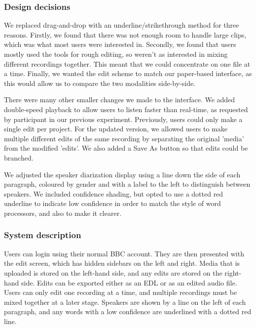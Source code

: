 \subsubsection{Design decisions}

We replaced drag-and-drop with an underline/strikethrough method for three reasons.
Firstly, we found that there was not enough room to handle large clips, which was what most users were interested in.
Secondly, we found that users mostly used the tools for rough editing, so weren't as interested in mixing different
recordings together. This meant that we could concentrate on one file at a time.
Finally, we wanted the edit scheme to match our paper-based interface, as this would allow us to compare the two
modalities side-by-side.

There were many other smaller changes we made to the interface. We added double-speed playback to allow users to listen
faster than real-time, as requested by participant in our previous experiment. Previously, users could only make a
single edit per project. For the updated version, we allowed users to make multiple different edits of the same
recording by separating the original 'media' from the modified 'edits'. We also added a Save As button so that edits
could be branched.

We adjusted the speaker diarization display using a line down the side of each paragraph, coloured by gender and with a
label to the left to distinguish between speakers. We included confidence shading, but opted to use a dotted red
underline to indicate low confidence in order to match the style of word processors, and also to make it clearer.

\subsubsection{System description}

Users can login using their normal BBC account. They are then presented with the edit screen, which
has hidden sidebars on the left and right. Media that is uploaded is stored on the left-hand side, and any edits are
stored on the right-hand side. Edits can be exported either as an EDL or as an edited audio file. Users can only edit
one recording at a time, and multiple recordings must be mixed together at a later stage. Speakers are shown by a line
on the left of each paragraph, and any words with a low confidence are underlined with a dotted red line.

